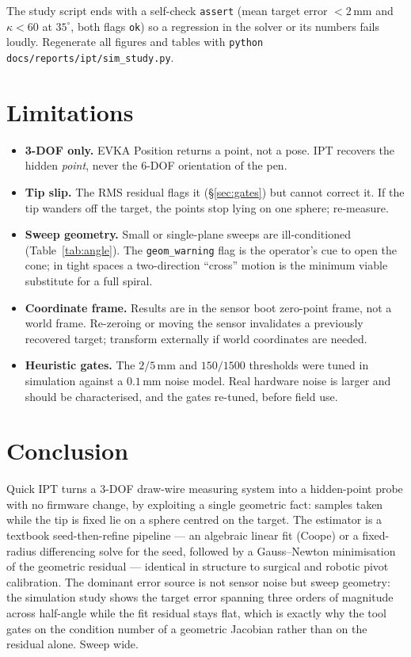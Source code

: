 \documentclass[11pt,a4paper]{article}
\begin{document}
The study script ends with a self-check \texttt{assert} (mean target error
$<2$\,mm and $\kappa<60$ at $35^\circ$, both flags \texttt{ok}) so a regression in the
solver or its numbers fails loudly. Regenerate all figures and tables with
\texttt{python docs/reports/ipt/sim\_study.py}.

\section{Limitations}

\begin{itemize}
\item \textbf{3-DOF only.} EVKA Position returns a point, not a pose. IPT recovers
  the hidden \emph{point}, never the 6-DOF orientation of the pen.
\item \textbf{Tip slip.} The RMS residual flags it (\S\ref{sec:gates}) but cannot
  correct it. If the tip wanders off the target, the points stop lying on one
  sphere; re-measure.
\item \textbf{Sweep geometry.} Small or single-plane sweeps are ill-conditioned
  (Table~\ref{tab:angle}). The \texttt{geom\_warning} flag is the operator's cue to
  open the cone; in tight spaces a two-direction ``cross'' motion is the minimum
  viable substitute for a full spiral.
\item \textbf{Coordinate frame.} Results are in the sensor boot zero-point frame,
  not a world frame. Re-zeroing or moving the sensor invalidates a previously
  recovered target; transform externally if world coordinates are needed.
\item \textbf{Heuristic gates.} The $2/5$\,mm and $150/1500$ thresholds were tuned in
  simulation against a $0.1$\,mm noise model. Real hardware noise is larger and
  should be characterised, and the gates re-tuned, before field use.
\end{itemize}

\section{Conclusion}

Quick IPT turns a 3-DOF draw-wire measuring system into a hidden-point probe with no
firmware change, by exploiting a single geometric fact: samples taken while the tip
is fixed lie on a sphere centred on the target. The estimator is a textbook
seed-then-refine pipeline --- an algebraic linear fit (Coope) or a fixed-radius
differencing solve for the seed, followed by a Gauss--Newton minimisation of the
geometric residual --- identical in structure to surgical and robotic pivot
calibration. The dominant error source is not sensor noise but sweep geometry:
the simulation study shows the target error spanning three orders of magnitude
across half-angle while the fit residual stays flat, which is exactly why the tool
gates on the condition number of a geometric Jacobian rather than on the residual
alone. Sweep wide.
\end{document}
